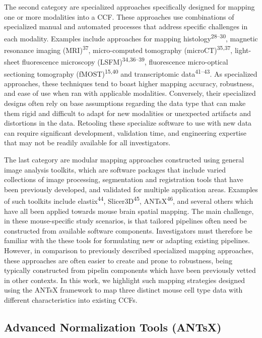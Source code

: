\documentclass[
  12pt,
]{article}
\begin{document}
The second category are specialized approaches specifically designed for
mapping one or more modalities into a CCF. These approaches use
combinations of specialized manual and automated processes that address
specific challenges in each modality. Examples include approaches for
mapping histology\textsuperscript{28--30}, magnetic resonance imaging
(MRI)\textsuperscript{37}, micro-computed tomography
(microCT)\textsuperscript{35,37}, light-sheet fluorescence microscopy
(LSFM)\textsuperscript{34,36--39}, fluorescence micro-optical sectioning
tomography (fMOST)\textsuperscript{15,40} and transcriptomic
data\textsuperscript{41--43}. As specialized approaches, these
techniques tend to boast higher mapping accuracy, robustness, and ease
of use when ran with applicable modalities. Conversely, their
specialized designs often rely on base assumptions regarding the data
type that can make them rigid and difficult to adapt for new modalities
or unexpected artifacts and distortions in the data. Retooling these
specialize software to use with new data can require significant
development, validation time, and engineering expertise that may not be
readily available for all investigators.

The last category are modular mapping approaches constructed using
general image analysis toolkits, which are software packages that
include varied collections of image processing, segmentation and
registration tools that have been previously developed, and validated
for multiple application areas. Examples of such toolkits include
elastix\textsuperscript{44}, Slicer3D\textsuperscript{45},
ANTsX\textsuperscript{46}, and several others which have all been
applied towards mouse brain spatial mapping. The main challenge, in
these mouse-specific study scenarios, is that tailored pipelines often
need be constructed from available software components. Investigators
must therefore be familiar with the these tools for formulating new or
adapting existing pipelines. However, in comparison to previously
described specialized mapping approaches, these approaches are often
easier to create and prone to robustness, being typically constructed
from pipelin components which have been previously vetted in other
contexts. In this work, we highlight such mapping strategies designed
using the ANTsX framework to map three distinct mouse cell type data
with different characteristics into existing CCFs.

\subsection{Advanced Normalization Tools
(ANTsX)}\label{advanced-normalization-tools-antsx}
\end{document}
